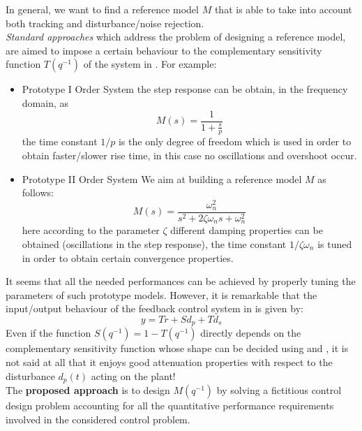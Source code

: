 In general, we want to find a reference model $M$ that is able to take into account both tracking and disturbance/noise rejection. \\
\textit{Standard approaches} which address the problem of designing a reference model, are aimed to impose a certain behaviour to the complementary sensitivity function $T(q^{-1})$ of the system in . For example:
\begin{itemize}
    \item \textsf{Prototype I Order System} the step response can be obtain, in the frequency domain, as 
    \begin{equation}\label{eq:prot_first}
        M(s)=\frac{1}{1+\frac{s}{p}}
    \end{equation}
    the time constant $1/p$ is the only degree of freedom which is used in order to obtain faster/slower rise time, in this case no oscillations and overshoot occur.
     \item \textsf{Prototype II Order System} We aim at building a reference model $M$ as follows: 
     \begin{equation}\label{eq:prot_second}
        M(s)=\frac{\omega_n^2}{s^2+2\zeta\omega_n{s}+\omega_n^2}
     \end{equation}
     here according to the parameter $\zeta$ different damping properties can be obtained (oscillations in the step response), the time constant $1/{\zeta\omega_n}$ is tuned in order to obtain certain convergence properties.
\end{itemize}

\noindent
It seems that all the needed performances can be achieved by properly tuning the parameters of such prototype models. However, it is remarkable that the input/output behaviour of the feedback control system in  is given by: 
\begin{equation}
    y=Tr+S{d_p}+T{d_s}
\end{equation}
Even if the function $S(q^{-1})=1-T(q^{-1})$ directly depends on the complementary sensitivity function whose shape can be decided using  and , it is not said at all that it enjoys good attenuation properties with respect to the disturbance $d_p(t)$ acting on the plant! \\
The \textbf{proposed approach} is to design $M(q^{-1})$ by solving a fictitious control design problem accounting for all the quantitative performance requirements involved in the considered control problem.

